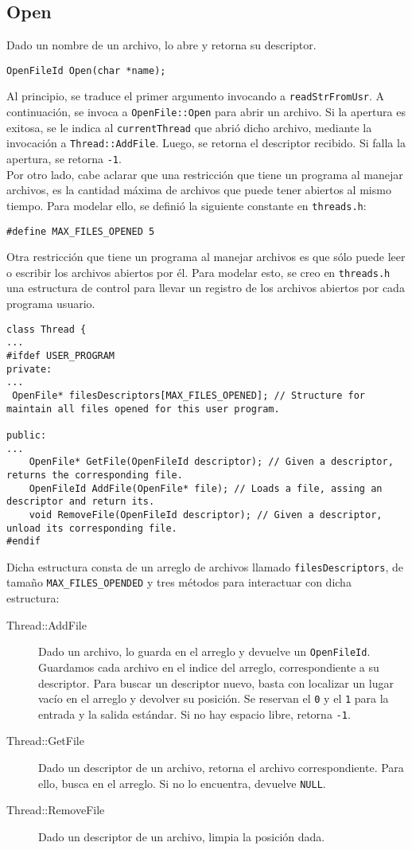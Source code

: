 \subsection*{Open}
Dado un nombre de un archivo, lo abre y retorna su descriptor.
\begin{lstlisting}[style=C]
OpenFileId Open(char *name);
\end{lstlisting}
Al principio, se traduce el primer argumento invocando a \texttt{readStrFromUsr}. A continuación, se invoca a \texttt{OpenFile::Open} para abrir un archivo. Si la apertura es exitosa, se le indica al \texttt{currentThread} que abrió dicho archivo, mediante la invocación a \texttt{Thread::AddFile}. Luego, se retorna el descriptor recibido. Si falla la apertura, se retorna \texttt{-1}.\\
Por otro lado, cabe aclarar que una restricción que tiene un programa al manejar archivos, es la cantidad máxima de archivos que puede tener abiertos al mismo tiempo. Para modelar ello, se definió la siguiente constante en \texttt{threads.h}:
\begin{lstlisting}[style=C]
#define MAX_FILES_OPENED 5
\end{lstlisting}
Otra restricción que tiene un programa al manejar archivos es que sólo puede leer o escribir los archivos abiertos por él. Para modelar esto, se creo en \texttt{threads.h} una estructura de control para llevar un registro de los archivos abiertos por cada programa usuario.
\begin{lstlisting}[style=C]
class Thread {
...
#ifdef USER_PROGRAM
private:
...
 OpenFile* filesDescriptors[MAX_FILES_OPENED]; // Structure for maintain all files opened for this user program.

public:
...
    OpenFile* GetFile(OpenFileId descriptor); // Given a descriptor, returns the corresponding file.
    OpenFileId AddFile(OpenFile* file); // Loads a file, assing an descriptor and return its.
    void RemoveFile(OpenFileId descriptor); // Given a descriptor, unload its corresponding file.
#endif
\end{lstlisting}
Dicha estructura consta de un arreglo de archivos llamado \texttt{filesDescriptors}, de tamaño \texttt{MAX\_FILES\_OPENDED} y tres métodos para interactuar con dicha estructura:
\begin{description}
    \item[Thread::AddFile] Dado un archivo, lo guarda en el arreglo y devuelve un \texttt{OpenFileId}. Guardamos cada archivo en el indice del arreglo, correspondiente a su descriptor. Para buscar un descriptor nuevo, basta con localizar un lugar vacío en el arreglo y devolver su posición. Se reservan el \texttt{0} y el \texttt{1} para la entrada y la salida estándar. Si no hay espacio libre, retorna \texttt{-1}.
    \item[Thread::GetFile] Dado un descriptor de un archivo, retorna el archivo correspondiente. Para ello, busca en el arreglo. Si no lo encuentra, devuelve \texttt{NULL}.
    \item[Thread::RemoveFile] Dado un descriptor de un archivo, limpia la posición dada.
\end{description}
